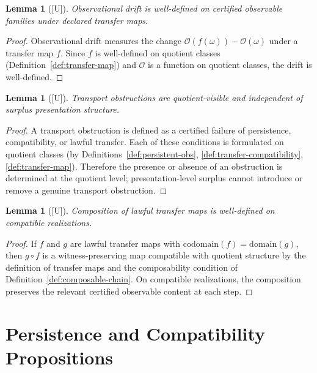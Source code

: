 \documentclass[12pt,oneside]{amsbook}
\theoremstyle{plain}
\newtheorem{lemma}[theorem]{Lemma}
\theoremstyle{definition}
\theoremstyle{remark}
\newcommand{\status}[1]{\textup{[#1]}}
\begin{document}
\begin{lemma}[\status{U}]\label{lem:drift-welldef}
Observational drift is well-defined on certified observable families
under declared transfer maps.
\end{lemma}

\begin{proof}
Observational drift measures the change $\mathcal{O}(f(\omega)) -
\mathcal{O}(\omega)$ under a transfer map $f$.  Since $f$ is
well-defined on quotient classes (Definition~\ref{def:transfer-map})
and $\mathcal{O}$ is a function on quotient classes, the drift is
well-defined.
\end{proof}

\begin{lemma}[\status{U}]\label{lem:obstructions-quotient-visible}
Transport obstructions are quotient-visible and independent of surplus
presentation structure.
\end{lemma}

\begin{proof}
A transport obstruction is defined as a certified failure of
persistence, compatibility, or lawful transfer.  Each of these
conditions is formulated on quotient classes (by
Definitions~\ref{def:persistent-obs}, \ref{def:transfer-compatibility},
\ref{def:transfer-map}).  Therefore the presence or absence of an
obstruction is determined at the quotient level; presentation-level
surplus cannot introduce or remove a genuine transport obstruction.
\end{proof}

\begin{lemma}[\status{U}]\label{lem:composition-welldef}
Composition of lawful transfer maps is well-defined on compatible
realizations.
\end{lemma}

\begin{proof}
If $f$ and $g$ are lawful transfer maps with $\mathrm{codomain}(f) =
\mathrm{domain}(g)$, then $g \circ f$ is a witness-preserving map
compatible with quotient structure by the definition of transfer maps
and the composability condition of
Definition~\ref{def:composable-chain}.  On compatible realizations,
the composition preserves the relevant certified observable content at
each step.
\end{proof}

\section{Persistence and Compatibility Propositions}
\end{document}
